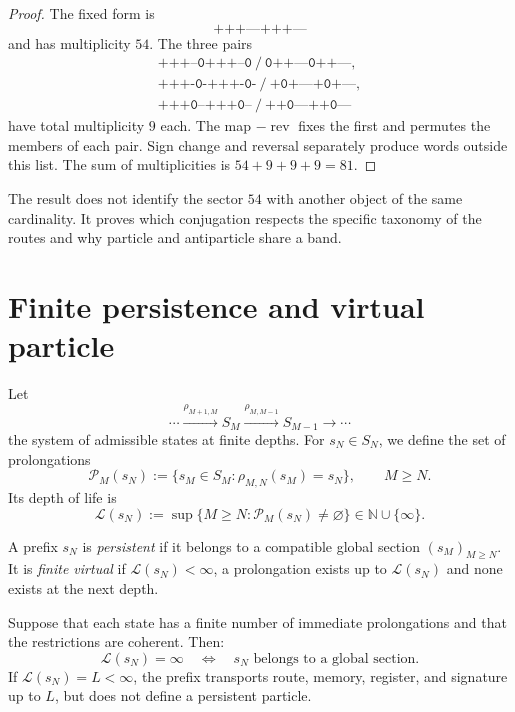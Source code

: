 \begin{proof}
The fixed form is
\[
\texttt{+++---+++---}
\]
and has multiplicity \(54\). The three pairs
\[
\begin{array}{c}
\texttt{+++--0+++--0}\ /\ \texttt{0++---0++---},\\
\texttt{+++-0-+++-0-}\ /\ \texttt{+0+---+0+---},\\
\texttt{+++0--+++0--}\ /\ \texttt{++0---++0---}
\end{array}
\]
have total multiplicity \(9\) each. The map
\(-\operatorname{rev}\) fixes the first and permutes the members of each
pair. Sign change and reversal separately produce words
outside this list. The sum of multiplicities is
\(54+9+9+9=81\).
\end{proof}

The result does not identify the sector \(54\) with another object of the same
cardinality. It proves which conjugation respects the specific taxonomy of the
routes and why particle and antiparticle share a band.

\section{Finite persistence and virtual particle}

Let
\[
\cdots\xrightarrow{\rho_{M+1,M}}S_M
\xrightarrow{\rho_{M,M-1}}S_{M-1}\xrightarrow{}\cdots
\]
the system of admissible states at finite depths. For
\(s_N\in S_N\), we define the set of prolongations
\[
\mathcal P_M(s_N)
:=
\{s_M\in S_M:\rho_{M,N}(s_M)=s_N\},
\qquad M\geq N.
\]
Its depth of life is
\[
\mathcal L(s_N)
:=\sup\{M\geq N:\mathcal P_M(s_N)\neq\varnothing\}
\in\mathbb N\cup\{\infty\}.
\]

\begin{definition}
\label{def:persistencia-virtualidad}
A prefix \(s_N\) is \emph{persistent} if it belongs to a compatible global section
\((s_M)_{M\geq N}\). It is \emph{finite virtual} if
\(\mathcal L(s_N)<\infty\), a prolongation exists up to
\(\mathcal L(s_N)\) and none exists at the next depth.
\end{definition}

\begin{theorem}
\label{thm:criterio-persistencia-virtual}
Suppose that each state has a finite number of immediate prolongations
and that the restrictions are coherent. Then:
\[
\mathcal L(s_N)=\infty
\quad\Longleftrightarrow\quad
s_N\text{ belongs to a global section}.
\]
If \(\mathcal L(s_N)=L<\infty\), the prefix transports route, memory,
register, and signature up to \(L\), but does not define a persistent particle.
\end{theorem}

